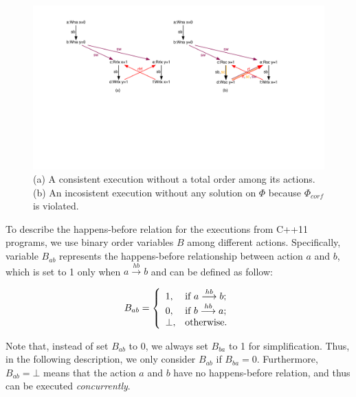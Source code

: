 \documentclass[preprint, numbers, 10pt]{sigplanconf}
\begin{document}
\begin{figure}%
\centering\includegraphics[scale=0.34]{noStrictOrder.pdf} %
\caption{(a) A consistent execution without a total order among
its actions. (b) An incosistent execution without any solution
on $\Phi$ because $\Phi_{corf}$ is violated. }
\label{fig:noStrictOrder}
\end{figure}

To describe the happens-before relation for the executions from C++11 programs, 
we use binary order variables $B$ among different actions.
Specifically, variable $B_{ab}$ represents the happens-before
relationship between action $a$ and $b$, which is set to 1 only when 
$a \stackrel{hb}{\longrightarrow} b$ and 
can be defined as follow: 

\[ B_{ab} = \left\{
  \begin{array}{l l}
    1,           &  {\text{if $a \stackrel{hb}{\longrightarrow} b$}};\\
    0,           &  {\text{if $b \stackrel{hb}{\longrightarrow} a$}};\\
    \bot,  &  \text{otherwise}.
  \end{array} \right.\]

Note that, instead of set $B_{ab}$ to 0, we always set $B_{ba}$ to 1 for simplification. 
Thus, in the following description, we only consider $B_{ab}$ if $B_{ba}=0$. 
Furthermore, $B_{ab}=\bot$ means that the action $a$ and $b$
have no happens-before relation, and thus can be executed \textit{concurrently}.   
\end{document}
